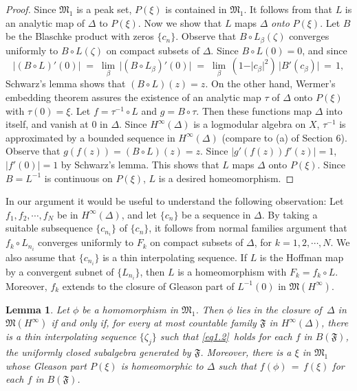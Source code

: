\documentclass[12pt]{amsart}
\theoremstyle{plain}
\newtheorem{lem}{Lemma}[section]
\numberwithin{equation}{section}
\begin{document}
\begin{proof}
Since $\mathfrak{M}_1$ is a peak set, $P(\xi)$ is contained
in $\mathfrak{M}_1$. It follows from \cite[Chapter X, Lemma 1.1]{Ga}
that $L$ is an analytic map of $\Delta$ to $P(\xi)$. Now we show
that $L$ maps $\Delta$ {\it onto} $P(\xi)$. Let $B$ be the Blaschke
product with zeros $\{c_n\}$. Observe that $B\circ L_\beta(\zeta)$
converges uniformly to $B\circ L(\zeta)$ on compact subsets of
$\Delta$. Since
$B\circ L(0)=0$, and since
\begin{equation*}
\vert(B\circ L)'(0)\vert \;=\; \lim_\beta\,
\vert(B\circ L_\beta)'(0)\vert
 \;=\; \lim_\beta \,(1-\vert c_\beta\vert^2)\,
 \vert B'(c_\beta)\vert \,=\,1,
\end{equation*}
Schwarz's lemma shows that $(B\circ L)(z) = z$. On the other
hand, Wermer's embedding theorem assures the existence of
an analytic map $\tau$ of $\Delta$ onto $P(\xi)$
with $\tau(0)=\xi$. Let $f=\tau^{-1}\circ L$ and
$g=B\circ \tau$. Then these functions map $\Delta$
into itself, and vanish at $0$ in $\Delta$. Since
$H^\infty(\Delta)$ is a logmodular algebra on $X$,
$\tau^{-1}$ is approximated by a bounded sequence in
$H^\infty(\Delta)$ (compare to (a) of Section 6). Observe that
$g(f(z)) = (B\circ L)(z) = z$. Since $\vert g'(f(z))f'(z)\vert = 1$,
$\vert f'(0)\vert = 1$ by Schwarz's lemma. This shows that $L$
maps $\Delta$ onto $P(\xi)$. Since $B=L^{-1}$ is continuous on
$P(\xi)$, $L$ is a desired homeomorphism.
\end{proof}


In our argument it would be useful to understand the following
observation: Let $f_1, f_2, \cdots, f_N$ be in $H^\infty(\Delta)$,
and let $\{c_n\}$ be a sequence in $\Delta$.
By taking a suitable subsequence $\{c_{n_i}\}$ of $\{c_n\}$, it
follows from normal families argument that $f_k\circ L_{n_i}$
converges uniformly to $F_k$ on compact subsets of $\Delta$,
for $k=1, 2, \cdots, N$. We also assume that $\{c_{n_i}\}$ is
a thin interpolating sequence. If $L$ is the Hoffman map by a
convergent subnet of $\{L_{n_i}\}$, then $L$ is a homeomorphism with
$F_k = f_k\circ L$. Moreover, $f_k$ extends to the closure of
Gleason part of $L^{-1}(0)$ in $\mathfrak{M}(H^\infty)$.

\begin{lem}
\label{lem2.3}
Let $\phi$ be a homomorphism in $\mathfrak{M}_1$.
Then $\phi$ lies in the closure of \,$\Delta$ in
$\mathfrak{M}(H^\infty)$ if and only if, for every
at most countable family $\mathfrak{F}$ in $H^\infty(\Delta)$,
there is a thin interpolating sequence $\{\zeta_j\}$ such that
\eqref{eq1.2}\, holds for each $f$ in $B(\mathfrak{F})$,
the uniformly closed subalgebra generated by $\mathfrak{F}$.
Moreover, there is a $\xi$ in $\mathfrak{M}_1$
whose Gleason part $P(\xi)$ is
homeomorphic to $\Delta$ such that $f(\phi)\,=\,f(\xi)$
for each $f$ in $B(\mathfrak{F})$.
\end{lem}
\end{document}
